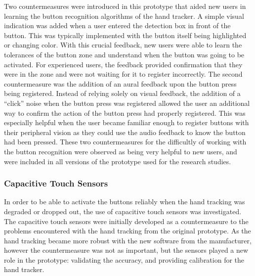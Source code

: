 Two countermeasures were introduced in this prototype that aided new users in learning the button recognition algorithms of the hand tracker.
A simple visual indication was added when a user entered the detection box in front of the button.
This was typically implemented with the button itself being highlighted or changing color.
With this crucial feedback, new users were able to learn the tolerances of the button zone and understand when the button was going to be activated.
For experienced users, the feedback provided confirmation that they were in the zone and were not waiting for it to register incorrectly.
The second countermeasure was the addition of an aural feedback upon the button press being registered.
Instead of relying solely on visual feedback, the addition of a ``click'' noise when the button press was registered allowed the user an additional way to confirm the action of the button press had properly registered.
This was especially helpful when the user became familiar enough to register buttons with their peripheral vision as they could use the audio feedback to know the button had been pressed.
These two countermeasures for the difficultly of working with the button recognition were observed as being very helpful to new users, and were included in all versions of the prototype used for the research studies.

\subsubsection{Capacitive Touch Sensors}
\label{sec:proto_cap_touch}

In order to be able to activate the buttons reliably when the hand tracking was degraded or dropped out, the use of capacitive touch sensors was investigated.
The capacitive touch sensors were initially developed as a countermeasure to the problems encountered with the hand tracking from the original prototype.
As the hand tracking became more robust with the new software from the manufacturer, however the countermeasure was not as important, but the sensors played a new role in the prototype: validating the accuracy, and providing calibration for the hand tracker.

